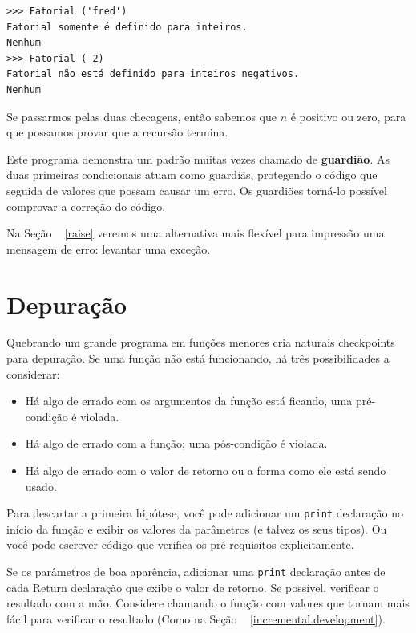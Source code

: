 \documentclass[10pt]{book}
\begin{document}
{{\begin{verbatim}
>>> Fatorial ('fred')
Fatorial somente é definido para inteiros.
Nenhum
>>> Fatorial (-2)
Fatorial não está definido para inteiros negativos.
Nenhum
\end{verbatim}
% 
Se passarmos pelas duas checagens, então sabemos que $ n $ é positivo ou
zero, para que possamos provar que a recursão termina.

Este programa demonstra um padrão muitas vezes chamado de {\bf guardião}.
As duas primeiras condicionais atuam como guardiãs, protegendo o código que
seguida de valores que possam causar um erro. Os guardiões torná-lo
possível comprovar a correção do código.

Na Seção ~ \ref{raise} veremos uma alternativa mais flexível para impressão
uma mensagem de erro: levantar uma exceção.


\section{Depuração}
\label{factdebug}

Quebrando um grande programa em funções menores cria naturais
checkpoints para depuração. 
Se uma função não está funcionando, há
três possibilidades a considerar:

\begin{itemize}

\item Há algo de errado com os argumentos da função
está ficando, uma pré-condição é violada.

\item Há algo de errado com a função; uma pós-condição
é violada.

\item Há algo de errado com o valor de retorno ou a
forma como ele está sendo usado.

\end{itemize}

Para descartar a primeira hipótese, você pode adicionar um {\tt print} declaração
no início da função e exibir os valores da
parâmetros (e talvez os seus tipos). Ou você pode escrever código
que verifica os pré-requisitos explicitamente.

Se os parâmetros de boa aparência, adicionar uma {\tt print} declaração antes de cada
{Return \tt} declaração que exibe o valor de retorno. Se
possível, verificar o resultado com a mão. Considere chamando o
função com valores que tornam mais fácil para verificar o resultado
(Como na Seção ~ \ref {incremental.development}).

}}
\end{document}
